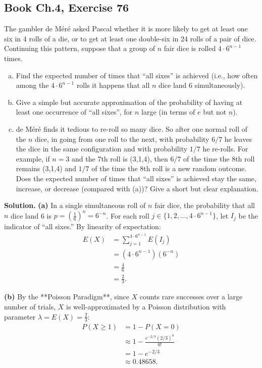 \documentclass[11pt,a4paper]{article}
\begin{document}
\subsection{Book Ch.4, Exercise 76}
\begin{tcolorbox}[title={Book Ch.4, Exercise 76}]
The gambler de Méré asked Pascal whether it is more likely to get at least one six in 4 rolls of a die, or to get at least one double-six in 24 rolls of a pair of dice. Continuing this pattern, suppose that a group of $n$ fair dice is rolled $4 \cdot 6^{n-1}$ times.
\begin{enumerate}[(a)]
\item Find the expected number of times that ``all sixes'' is achieved (i.e., how often among the $4 \cdot 6^{n-1}$ rolls it happens that all $n$ dice land 6 simultaneously).
\item Give a simple but accurate approximation of the probability of having at least one occurrence of ``all sixes'', for $n$ large (in terms of $e$ but not $n$).
\item de Méré finds it tedious to re-roll so many dice. So after one normal roll of the $n$ dice, in going from one roll to the next, with probability $6/7$ he leaves the dice in the same configuration and with probability $1/7$ he re-rolls. For example, if $n = 3$ and the 7th roll is (3,1,4), then $6/7$ of the time the 8th roll remains (3,1,4) and $1/7$ of the time the 8th roll is a new random outcome. Does the expected number of times that ``all sixes'' is achieved stay the same, increase, or decrease (compared with (a))? Give a short but clear explanation.
\end{enumerate}
\end{tcolorbox}

\noindent \textbf{Solution.} \textbf{(a)} In a single simultaneous roll of $n$ fair dice, the probability that all $n$ dice land 6 is $p = \left(\frac{1}{6}\right)^n = 6^{-n}$. For each roll $j \in \{1, 2, \dots, 4 \cdot 6^{n-1}\}$, let $I_j$ be the indicator of ``all sixes.'' By linearity of expectation:
\begin{align*}
E(X) &= \sum_{j=1}^{4 \cdot 6^{n-1}} E(I_j) \\
&= \left(4 \cdot 6^{n-1}\right) \left(6^{-n}\right) \\
&= \frac{4}{6} \\
&= \frac{2}{3}.
\end{align*}

\vspace{4pt}
\noindent \textbf{(b)} By the **Poisson Paradigm**, since $X$ counts rare successes over a large number of trials, $X$ is well-approximated by a Poisson distribution with parameter $\lambda = E(X) = \frac{2}{3}$:
\begin{align*}
P(X \ge 1) &= 1 - P(X = 0) \\
&\approx 1 - \frac{e^{-2/3} (2/3)^0}{0!} \\
&= 1 - e^{-2/3} \\
&\approx 0.48658.
\end{align*}
\end{document}

